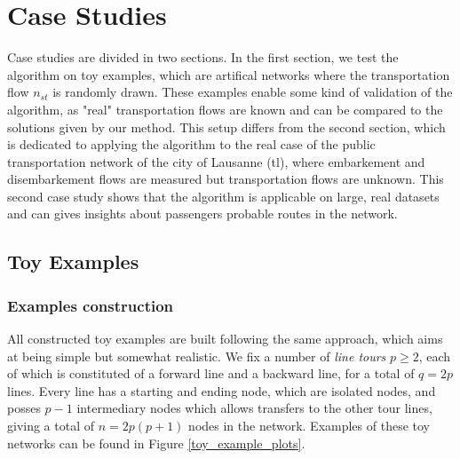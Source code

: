 \documentclass{bmcart}
\begin{document}
 

\section{Case Studies}
\label{casestudies}

Case studies are divided in two sections. In the first section, we test the algorithm on toy examples, which are artifical networks where the transportation flow $n_{st}$ is randomly drawn. These examples enable some kind of validation of the algorithm, as "real" transportation flows are known and can be compared to the solutions given by our method. This setup differs from the second section, which is dedicated to applying the algorithm to the real case of the public transportation network of the city of Lausanne (tl), where embarkement and disembarkement flows are measured but transportation flows are unknown. This second case study shows that the algorithm is applicable on large, real datasets and can gives insights about passengers probable routes in the network.

\subsection{Toy Examples}

\subsubsection{Examples construction}
\label{example_construction}

All constructed toy examples are built following the same approach, which aims at being simple but somewhat realistic. We fix a number of \emph{line tours} $p \geq 2$, each of which is constituted of a forward line and a backward line, for a total of $q = 2p$ lines. Every line has a starting and ending node, which are isolated nodes, and posses $p-1$ intermediary nodes which allows transfers to the other tour lines, giving a total of $n = 2p(p + 1)$ nodes in the network. Examples of these toy networks can be found in Figure \ref{toy_example_plots}.
\end{document}
